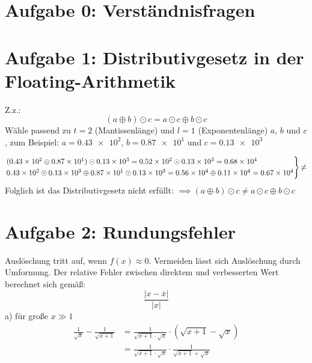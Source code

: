 



\maketitle

\section*{Aufgabe 0: Verständnisfragen}

\section*{Aufgabe 1: Distributivgesetz in der Floating-Arithmetik}
Z.z.:
\begin{equation*}
  (a \oplus b) \odot c = a \odot c \oplus b \odot c
\end{equation*}
\noindent
Wähle passend zu $t=2$ (Mantissenlänge) und $l=1$ (Exponentenlänge) $a$, $b$ und $c$,
zum Beispiel: $a=\num{0,43e2}$, $b=\num{0,87e1}$ und $c=\num{0,13e3}$

\begin{align*}
\begin{rcases}
  (\num{0,43e2} \oplus \num{0,87e1}) \odot \num{0,13e3}
  = \num{0,52e2} \odot \num{0,13e3}
  = \num{0,68e4} \\
  \num{0,43e2} \odot \num{0,13e3} \oplus \num{0,87e1} \odot  \num{0,13e3}
  = \num{0,56e4} \oplus \num{0,11e4}
  = \num{0,67e4}
\end{rcases}
{\ne}
\end{align*}
\noindent
Folglich ist das Distributivgesetz  nicht erfüllt:
$\implies (a \oplus b) \odot c \ne a \odot c \oplus b \odot c$

\section*{Aufgabe 2: Rundungsfehler}
Auslöschung tritt auf, wenn $f(x) \approx 0$. Vermeiden lässt sich Auslöschung durch Umformung.
Der relative Fehler zwischen direktem und verbesserten Wert berechnet sich gemäß:
\begin{equation*}
  \frac{\vert x - \bar{x} \vert}{\vert x \vert}
\end{equation*}
a) für große $x \gg 1$
\begin{align*}
  \frac{1}{\sqrt{x}}-\frac{1}{\sqrt{x+1}} &= \frac{1}{\sqrt{x+1} \cdot \sqrt{x}} \cdot \left(\sqrt{x+1} - \sqrt{x}\right) \\
                                          &= \frac{1}{\sqrt{x+1} \cdot \sqrt{x}} \cdot \frac{1}{\sqrt{x+1}+\sqrt{x}}
\end{align*}

